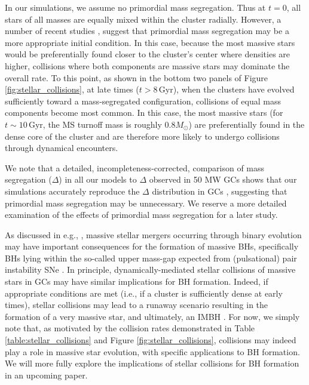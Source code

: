 \documentclass[twocolumn,tighten]{aastex63}
\begin{document}
In our simulations, we assume no primordial mass segregation. Thus at $t=0$, all stars of all masses are equally mixed within the cluster radially. However, a number of recent studies \citep[e.g.,][]{Baumgardt2008,Subr2008,Habibi2013,Pang2013,Pavlik2019}, suggest that primordial mass segregation may be a more appropriate initial condition. In this case, because the most massive stars would be preferentially found closer to the cluster's center where densities are higher, collisions where both components are massive stars may dominate the overall rate. To this point, as shown in the bottom two panels of Figure \ref{fig:stellar_collisions}, at late times ($t>8\,$Gyr), when the clusters have evolved sufficiently toward a mass-segregated configuration, collisions of equal mass components become most common. In this case, the most massive stars (for $t\sim10\,$Gyr, the MS turnoff mass is roughly $0.8M_{\odot}$) are preferentially found in the dense core of the cluster and are therefore more likely to undergo collisions through dynamical encounters.

We note that a detailed, incompleteness-corrected, comparison of mass segregation ($\Delta$) in all our models to $\Delta$ observed in 50 MW GCs shows that our simulations accurately reproduce the $\Delta$ distribution in GCs \citep[see Figure 3 of][]{Weatherford2019}, suggesting that primordial mass segregation may be unnecessary. We reserve a more detailed examination of the effects of primordial mass segregation for a later study.

As discussed in e.g., \citet{Spera2019,Banerjee2019}, massive stellar mergers occurring through binary evolution may have important consequences for the formation of massive BHs, specifically BHs lying within the so-called upper mass-gap expected from (pulsational) pair instability SNe \citep[e.g.,][]{Belczynski2016b,Woosley2016,Spera2017}. In principle, dynamically-mediated stellar collisions of massive stars in GCs may have similar implications for BH formation. Indeed, if appropriate conditions are met (i.e., if a cluster is sufficiently dense at early times), stellar collisions may lead to a runaway scenario resulting in the formation of a very massive star, and ultimately, an IMBH \citep[e.g.,][]{PortegiesZwart2004,Freitag2006,Giersz2015,Mapelli2016}. For now, we simply note that, as motivated by the collision rates demonstrated in Table \ref{table:stellar_collisions} and Figure \ref{fig:stellar_collisions}, collisions may indeed play a role in massive star evolution, with specific applications to BH formation. We will more fully explore the implications of stellar collisions for BH formation in an upcoming paper.
\end{document}
